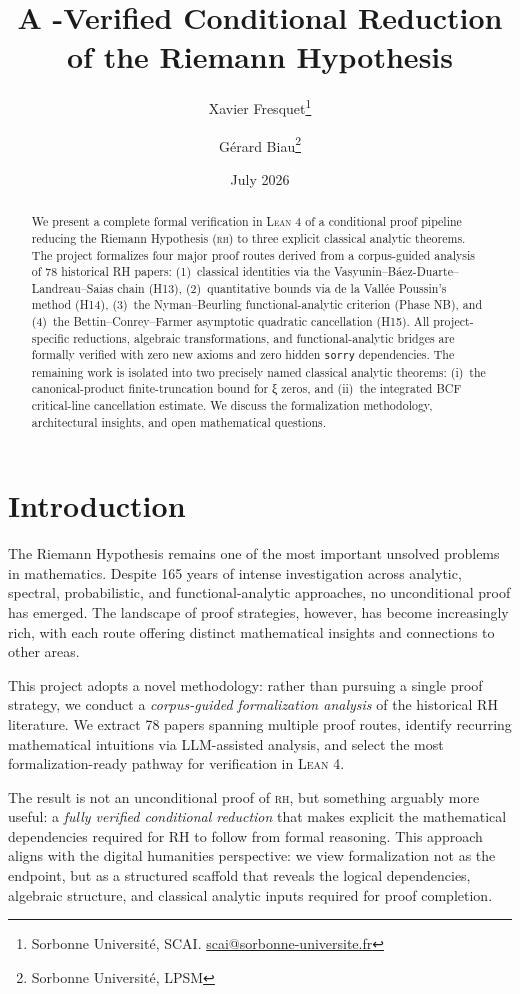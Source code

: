 \documentclass[11pt,a4paper]{article}
\title{A \Lean-Verified Conditional Reduction of the Riemann Hypothesis}
\author{%
  Xavier Fresquet\thanks{Sorbonne Université, SCAI. \url{scai@sorbonne-universite.fr}}
  \and
  Gérard Biau\thanks{Sorbonne Université, LPSM}
}
\date{July 2026}
\newcommand{\RH}{\textsc{rh}\xspace}
\newcommand{\Lean}{\textsc{Lean}\xspace}
\newcommand{\CodeName}[1]{\texttt{#1}}
\begin{document}
\maketitle

\begin{abstract}
We present a complete formal verification in \Lean 4 of a conditional proof pipeline reducing the Riemann Hypothesis (\RH) to three explicit classical analytic theorems. The project formalizes four major proof routes derived from a corpus-guided analysis of 78 historical RH papers: (1)~classical identities via the Vasyunin--Báez-Duarte--Landreau--Saias chain (H13), (2)~quantitative bounds via de la Vallée Poussin's method (H14), (3)~the Nyman--Beurling functional-analytic criterion (Phase NB), and (4)~the Bettin--Conrey--Farmer asymptotic quadratic cancellation (H15). All project-specific reductions, algebraic transformations, and functional-analytic bridges are formally verified with zero new axioms and zero hidden \CodeName{sorry} dependencies. The remaining work is isolated into two precisely named classical analytic theorems: (i)~the canonical-product finite-truncation bound for ξ zeros, and (ii)~the integrated BCF critical-line cancellation estimate. We discuss the formalization methodology, architectural insights, and open mathematical questions.
\end{abstract}

\section{Introduction}
\label{sec:intro}

The Riemann Hypothesis remains one of the most important unsolved problems in mathematics. Despite 165 years of intense investigation across analytic, spectral, probabilistic, and functional-analytic approaches, no unconditional proof has emerged. The landscape of proof strategies, however, has become increasingly rich, with each route offering distinct mathematical insights and connections to other areas.

This project adopts a novel methodology: rather than pursuing a single proof strategy, we conduct a \emph{corpus-guided formalization analysis} of the historical RH literature. We extract 78 papers spanning multiple proof routes, identify recurring mathematical intuitions via LLM-assisted analysis, and select the most formalization-ready pathway for verification in \Lean 4.

The result is not an unconditional proof of \RH, but something arguably more useful: a \emph{fully verified conditional reduction} that makes explicit the mathematical dependencies required for RH to follow from formal reasoning. This approach aligns with the digital humanities perspective: we view formalization not as the endpoint, but as a structured scaffold that reveals the logical dependencies, algebraic structure, and classical analytic inputs required for proof completion.
\end{document}
